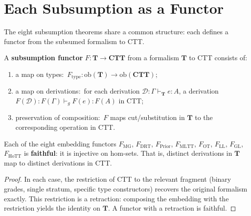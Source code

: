 \section{Each Subsumption as a Functor}
\label{sec:subsumption-functors}

The eight subsumption theorems share a common structure: each defines
a functor from the subsumed formalism to CTT.

\begin{definition}
\label{def:subsumption-functor}
A \textbf{subsumption functor} $F : \mathbf{T} \to \mathbf{CTT}$ from
a formalism $\mathbf{T}$ to CTT consists of:
\begin{enumerate}[label=(\alph*)]
\item a map on types:\ $F_{\mathrm{type}} : \mathrm{ob}(\mathbf{T})
  \to \mathrm{ob}(\mathbf{CTT})$;
\item a map on derivations:\ for each derivation
  $\mathcal{D} : \Gamma \vdash_{\mathbf{T}} e : A$, a derivation
  $F(\mathcal{D}) : F(\Gamma) \vdash_{g} F(e) : F(A)$ in CTT;
\item preservation of composition:\ $F$ maps cut/substitution in
  $\mathbf{T}$ to the corresponding operation in CTT.
\end{enumerate}
\end{definition}

\begin{proposition}[Faithfulness]
\label{prop:faithfulness}
Each of the eight embedding functors $F_{\mathrm{MG}}$,
$F_{\mathrm{DRT}}$, $F_{\mathrm{Prior}}$, $F_{\mathrm{MLTT}}$,
$F_{\mathrm{OT}}$, $F_{\mathrm{LL}}$, $F_{\mathrm{GL}}$,
$F_{\mathrm{HoTT}}$ is \textbf{faithful}: it is injective on
hom-sets.  That is, distinct derivations in $\mathbf{T}$ map to
distinct derivations in CTT.
\end{proposition}

\begin{proof}
In each case, the restriction of CTT to the relevant fragment
(binary grades, single stratum, specific type constructors) recovers
the original formalism exactly.  This restriction is a retraction:
composing the embedding with the restriction yields the identity on
$\mathbf{T}$.  A functor with a retraction is faithful.
\end{proof}

